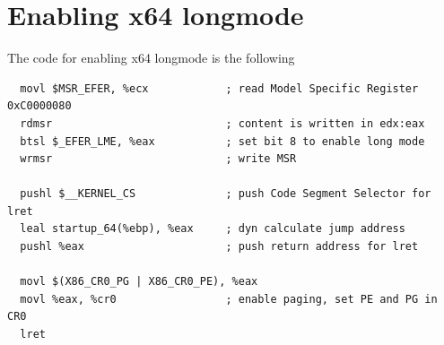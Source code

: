 \documentclass[twoside]{article}
\begin{document}

\section{Enabling x64 longmode}

The code for enabling x64 longmode is the following

\begin{verbatim}
  movl $MSR_EFER, %ecx            ; read Model Specific Register 0xC0000080
  rdmsr                           ; content is written in edx:eax
  btsl $_EFER_LME, %eax           ; set bit 8 to enable long mode
  wrmsr                           ; write MSR

  pushl $__KERNEL_CS              ; push Code Segment Selector for lret
  leal startup_64(%ebp), %eax     ; dyn calculate jump address
  pushl %eax                      ; push return address for lret

  movl $(X86_CR0_PG | X86_CR0_PE), %eax
  movl %eax, %cr0                 ; enable paging, set PE and PG in CR0
  lret 
\end{verbatim}
\end{document}
